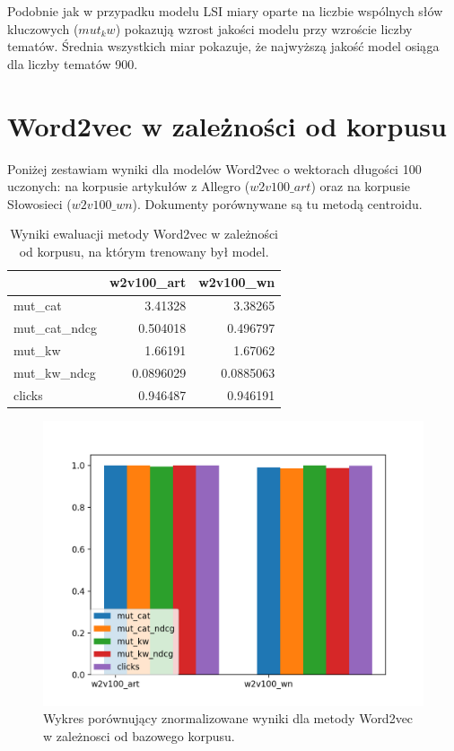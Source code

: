 \documentclass[pl]{minipw} %
\begin{document}
Podobnie jak w przypadku modelu LSI miary oparte na liczbie wspólnych słów kluczowych ($mut_kw$) pokazują wzrost jakości modelu przy wzroście liczby tematów. Średnia wszystkich miar pokazuje, że najwyższą jakość model osiąga dla liczby tematów 900.


\section{Word2vec w zależności od korpusu}

Poniżej zestawiam wyniki dla modelów Word2vec o wektorach długości 100 uczonych: na korpusie artykułów z Allegro ($w2v100\_art$) oraz na korpusie Słowosieci ($w2v100\_wn$). Dokumenty porównywane są tu metodą centroidu.

\begin{table}[H]
	\centering
	\begin{tabular}{lrr}
		\hline
		&   w2v100\_art &   w2v100\_wn \\
		\hline
		mut\_cat      &    3.41328   &   3.38265   \\
		mut\_cat\_ndcg &    0.504018  &   0.496797  \\
		mut\_kw       &    1.66191   &   1.67062   \\
		mut\_kw\_ndcg  &    0.0896029 &   0.0885063 \\
		clicks       &    0.946487  &   0.946191  \\
		\hline
	\end{tabular}
	\caption{Wyniki ewaluacji metody Word2vec w zależności od korpusu, na którym trenowany był model.}
\end{table}

\begin{figure}[H]
	\centering
	\includegraphics[width=1\textwidth]{img/results/w2v100_art_w2v100_wn_.png}
	\caption{Wykres porównujący znormalizowane wyniki dla metody Word2vec w zależnosci od bazowego korpusu.}
\end{figure}
\end{document}
